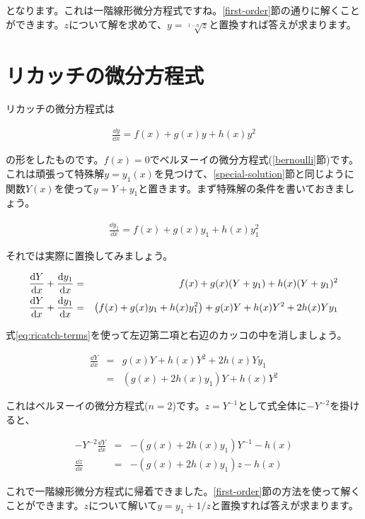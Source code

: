 \noindent
となります。これは一階線形微分方程式ですね。\ref{first-order}節の通りに解くことができます。$z$について解を求めて、$y=\sqrt[1-n]{z}$と置換すれば答えが求まります。






\section{リカッチの微分方程式}
\label{ricatch}
リカッチの微分方程式は

\begin{eqnarray}
    \frac{\dd y}{\dd x}=f(x)+g(x)y+h(x)y^2
\end{eqnarray}

の形をしたものです。$f(x)=0$でベルヌーイの微分方程式(\ref{bernoulli}節)です。これは頑張って特殊解$y=y_1(x)$を見つけて、\ref{special-solution}節と同じように関数$Y(x)$を使って$y=Y+y_1$と置きます。まず特殊解の条件を書いておきましょう。

\begin{eqnarray}
    \frac{\dd y_1}{\dd x}=f(x)+g(x)y_1+h(x)y_1^2
    \label{eq:ricatch-terms}
\end{eqnarray}

それでは実際に置換してみましょう。

\begin{eqnarray}
    \frac{\dd Y}{\dd x}+\frac{\dd y_1}{\dd x}&=&f(x)+g(x)(Y+y_1)+h(x)(Y+y_1)^2 \\
    \frac{\dd Y}{\dd x}+\frac{\dd y_1}{\dd x}&=&\pqty{f(x)+g(x)y_1+h(x)y_1^2}+g(x)Y+h(x)Y^2+2h(x)Yy_1
\end{eqnarray}

\noindent
式\ref{eq:ricatch-terms}を使って左辺第二項と右辺のカッコの中を消しましょう。

\begin{eqnarray}
    \frac{\dd Y}{\dd x}&=&g(x)Y+h(x)Y^2+2h(x)Yy_1 \nonumber \\
    &=&(g(x)+2h(x)y_1)Y+h(x)Y^2
\end{eqnarray}

これはベルヌーイの微分方程式($n=2$)です。$z=Y^{-1}$として式全体に$-Y^{-2}$を掛けると、

\begin{eqnarray}
    -Y^{-2}\frac{\dd Y}{\dd x}&=&-(g(x)+2h(x)y_1)Y^{-1}-h(x) \nonumber \\
    \frac{\dd z}{\dd x}&=&-(g(x)+2h(x)y_1)z-h(x)
\end{eqnarray}

これで一階線形微分方程式に帰着できました。\ref{first-order}節の方法を使って解くことができます。$z$について解いて$y=y_1+1/z$と置換すれば答えが求まります。







